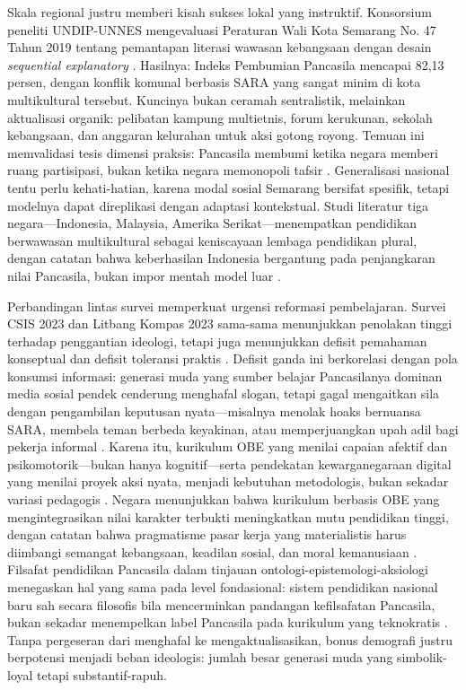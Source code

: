 \documentclass[journal]{IEEEtran}
\begin{document}
Skala regional justru memberi kisah sukses lokal yang instruktif. Konsorsium peneliti UNDIP-UNNES mengevaluasi Peraturan Wali Kota Semarang No. 47 Tahun 2019 tentang pemantapan literasi wawasan kebangsaan dengan desain \textit{sequential explanatory} \cite{wibowo2021,bpip2022}. Hasilnya: Indeks Pembumian Pancasila mencapai 82,13 persen, dengan konflik komunal berbasis SARA yang sangat minim di kota multikultural tersebut. Kuncinya bukan ceramah sentralistik, melainkan aktualisasi organik: pelibatan kampung multietnis, forum kerukunan, sekolah kebangsaan, dan anggaran kelurahan untuk aksi gotong royong. Temuan ini memvalidasi tesis dimensi praksis: Pancasila membumi ketika negara memberi ruang partisipasi, bukan ketika negara memonopoli tafsir \cite{wibowo2021,madungmere2021,taylor1994}. Generalisasi nasional tentu perlu kehati-hatian, karena modal sosial Semarang bersifat spesifik, tetapi modelnya dapat direplikasi dengan adaptasi kontekstual. Studi literatur tiga negara---Indonesia, Malaysia, Amerika Serikat---menempatkan pendidikan berwawasan multikultural sebagai keniscayaan lembaga pendidikan plural, dengan catatan bahwa keberhasilan Indonesia bergantung pada penjangkaran nilai Pancasila, bukan impor mentah model luar \cite{fajri2026}.

Perbandingan lintas survei memperkuat urgensi reformasi pembelajaran. Survei CSIS 2023 dan Litbang Kompas 2023 sama-sama menunjukkan penolakan tinggi terhadap penggantian ideologi, tetapi juga menunjukkan defisit pemahaman konseptual dan defisit toleransi praktis \cite{csis2023,kompas2023}. Defisit ganda ini berkorelasi dengan pola konsumsi informasi: generasi muda yang sumber belajar Pancasilanya dominan media sosial pendek cenderung menghafal slogan, tetapi gagal mengaitkan sila dengan pengambilan keputusan nyata---misalnya menolak hoaks bernuansa SARA, membela teman berbeda keyakinan, atau memperjuangkan upah adil bagi pekerja informal \cite{kurniasih2016,kamalashif2023,effend2024}. Karena itu, kurikulum OBE yang menilai capaian afektif dan psikomotorik---bukan hanya kognitif---serta pendekatan kewarganegaraan digital yang menilai proyek aksi nyata, menjadi kebutuhan metodologis, bukan sekadar variasi pedagogis \cite{effend2024,bpip2022}. Negara menunjukkan bahwa kurikulum berbasis OBE yang mengintegrasikan nilai karakter terbukti meningkatkan mutu pendidikan tinggi, dengan catatan bahwa pragmatisme pasar kerja yang materialistis harus diimbangi semangat kebangsaan, keadilan sosial, dan moral kemanusiaan \cite{negara2024}. Filsafat pendidikan Pancasila dalam tinjauan ontologi-epistemologi-aksiologi menegaskan hal yang sama pada level fondasional: sistem pendidikan nasional baru sah secara filosofis bila mencerminkan pandangan kefilsafatan Pancasila, bukan sekadar menempelkan label Pancasila pada kurikulum yang teknokratis \cite{pramita2024}. Tanpa pergeseran dari menghafal ke mengaktualisasikan, bonus demografi justru berpotensi menjadi beban ideologis: jumlah besar generasi muda yang simbolik-loyal tetapi substantif-rapuh.
\end{document}
